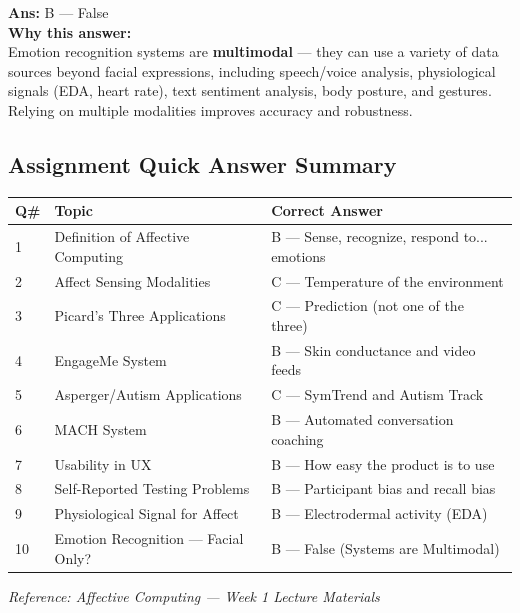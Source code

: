 \documentclass[11pt,a4paper]{article}
\newcommand{\bb}[1]{\textbf{#1}}
\begin{document}
\vspace{0.3cm}
\noindent\textbf{Ans:} B --- False\\[0.2cm]
\textbf{Why this answer:} \\
Emotion recognition systems are \textbf{multimodal} --- they can use a variety of data sources beyond facial expressions, including speech/voice analysis, physiological signals (EDA, heart rate), text sentiment analysis, body posture, and gestures. Relying on multiple modalities improves accuracy and robustness.
\vspace{0.4cm}

\medskip
\subsection*{Assignment Quick Answer Summary}

\begin{center}
\renewcommand{\arraystretch}{1.4}
\begin{tabular}{|L{0.8cm}|L{6.2cm}|L{8.2cm}|}
\hline
\bb{Q\#} & \bb{Topic} & \bb{Correct Answer} \\
 & Definition of Affective Computing & B --- Sense, recognize, respond to... emotions \\
2 & Affect Sensing Modalities & C --- Temperature of the environment \\
3 & Picard's Three Applications & C --- Prediction (not one of the three) \\
4 & EngageMe System & B --- Skin conductance and video feeds \\
5 & Asperger/Autism Applications & C --- SymTrend and Autism Track \\
6 & MACH System & B --- Automated conversation coaching \\
7 & Usability in UX & B --- How easy the product is to use \\
8 & Self-Reported Testing Problems & B --- Participant bias and recall bias \\
9 & Physiological Signal for Affect & B --- Electrodermal activity (EDA) \\
10 & Emotion Recognition --- Facial Only? & B --- False (Systems are Multimodal) \\
\hline
\end{tabular}
\end{center}

\medskip
{\small\textit{Reference: Affective Computing --- Week 1 Lecture Materials}}
\end{document}
